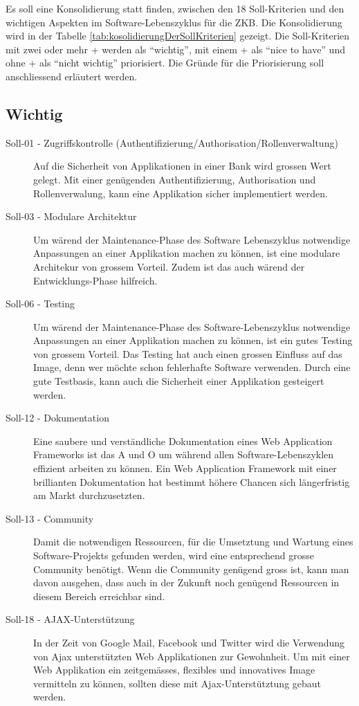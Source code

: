   \noindent
  Es soll eine Konsolidierung statt finden, zwischen den 18 Soll-Kriterien und
  den wichtigen Aspekten im Software-Lebenszyklus für die \ac{ZKB}. Die
  Konsolidierung wird in der Tabelle \ref{tab:kosolidierungDerSollKriterien}
  gezeigt. Die Soll-Kriterien mit zwei oder mehr + werden als ``wichtig'', mit
  einem + als ``nice to have'' und ohne + als ``nicht wichtig'' priorisiert. Die
  Gründe für die Priorisierung soll anschliessend erläutert werden.
  
  \subsection{Wichtig}
  
  \begin{description}
  \item[Soll-01 - Zugriffskontrolle 
  (Authentifizierung/Authorisation/Rollenverwaltung)]
  Auf die Sicherheit von Applikationen in einer Bank wird grossen Wert
  gelegt. Mit einer genügenden Authentifizierung, Authorisation und
  Rollenverwalung, kann eine Applikation sicher implementiert werden.
  
  \item[Soll-03 - Modulare Architektur]
  Um wärend der Maintenance-Phase des Software Lebenszyklus notwendige
  Anpassungen an einer Applikation machen zu können, ist eine modulare
  Architekur von grossem Vorteil. Zudem ist das auch wärend der
  Entwicklungs-Phase hilfreich.
  
  \item[Soll-06 - Testing]
  Um wärend der Maintenance-Phase des Software-Lebenszyklus notwendige
  Anpassungen an einer Applikation machen zu können, ist ein gutes Testing von
  grossem Vorteil. Das Testing hat auch einen grossen Einfluss auf das Image,
  denn wer möchte schon fehlerhafte Software verwenden. Durch eine gute
  Testbasis, kann auch die Sicherheit einer Applikation gesteigert werden.
  
  \item[Soll-12 - Dokumentation]
  Eine saubere und verständliche Dokumentation eines Web Application Frameworks
  ist das A und O um während allen Software-Lebenszyklen effizient arbeiten zu
  können. Ein Web Application Framework mit einer brillianten Dokumentation hat
  bestimmt höhere Chancen sich längerfristig am Markt durchzusetzten.
  
  \item[Soll-13 - Community]
  Damit die notwendigen Ressourcen, für die Umsetztung und Wartung eines
  Software-Projekts gefunden werden, wird eine entsprechend grosse Community
  benötigt. Wenn die Community genügend gross ist, kann man davon ausgehen,
  dass auch in der Zukunft noch genügend Ressourcen in diesem Bereich
  erreichbar sind.
  
  \item[Soll-18 - AJAX-Unterstützung]
  In der Zeit von Google Mail, Facebook und Twitter wird die Verwendung von
  \ac{Ajax} unterstützten Web Applikationen zur Gewohnheit. Um mit einer Web
  Applikation ein zeitgemässes, flexibles und innovatives Image vermitteln zu
  können, sollten diese mit Ajax-Unterstütztung gebaut werden.
  
  \end{description}
  
